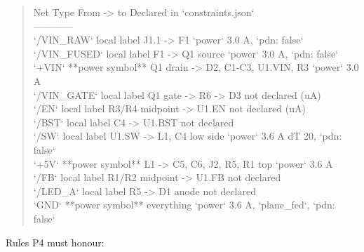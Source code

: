\documentclass[11pt,a4paper]{article}
\begin{document}
\begin{quote}\small\ttfamily\raggedright
\textbar{} Net \textbar{} Type \textbar{} From -\textgreater{} to \textbar{} Declared in `constraints.json` \textbar{}\\
\textbar{}---\textbar{}---\textbar{}---\textbar{}---\textbar{}\\
\textbar{} `/VIN\_RAW` \textbar{} local label \textbar{} J1.1 -\textgreater{} F1 \textbar{} `power` 3.0 A, `pdn: false` \textbar{}\\
\textbar{} `/VIN\_FUSED` \textbar{} local label \textbar{} F1 -\textgreater{} Q1 source \textbar{} `power` 3.0 A, `pdn: false` \textbar{}\\
\textbar{} `+VIN` \textbar{} {*}{*}power symbol{*}{*} \textbar{} Q1 drain -\textgreater{} D2, C1-C3, U1.VIN, R3 \textbar{} `power` 3.0 A \textbar{}\\
\textbar{} `/VIN\_GATE` \textbar{} local label \textbar{} Q1 gate -\textgreater{} R6 -\textgreater{} D3 \textbar{} not declared (uA) \textbar{}\\
\textbar{} `/EN` \textbar{} local label \textbar{} R3/R4 midpoint -\textgreater{} U1.EN \textbar{} not declared (uA) \textbar{}\\
\textbar{} `/BST` \textbar{} local label \textbar{} C4 -\textgreater{} U1.BST \textbar{} not declared \textbar{}\\
\textbar{} `/SW` \textbar{} local label \textbar{} U1.SW -\textgreater{} L1, C4 low side \textbar{} `power` 3.6 A dT 20, `pdn: false` \textbar{}\\
\textbar{} `+5V` \textbar{} {*}{*}power symbol{*}{*} \textbar{} L1 -\textgreater{} C5, C6, J2, R5, R1 top \textbar{} `power` 3.6 A \textbar{}\\
\textbar{} `/FB` \textbar{} local label \textbar{} R1/R2 midpoint -\textgreater{} U1.FB \textbar{} not declared \textbar{}\\
\textbar{} `/LED\_A` \textbar{} local label \textbar{} R5 -\textgreater{} D1 anode \textbar{} not declared \textbar{}\\
\textbar{} `GND` \textbar{} {*}{*}power symbol{*}{*} \textbar{} everything \textbar{} `power` 3.6 A, `plane\_fed`, `pdn: false` \textbar{}
\end{quote}
Rules P4 must honour:
\end{document}
